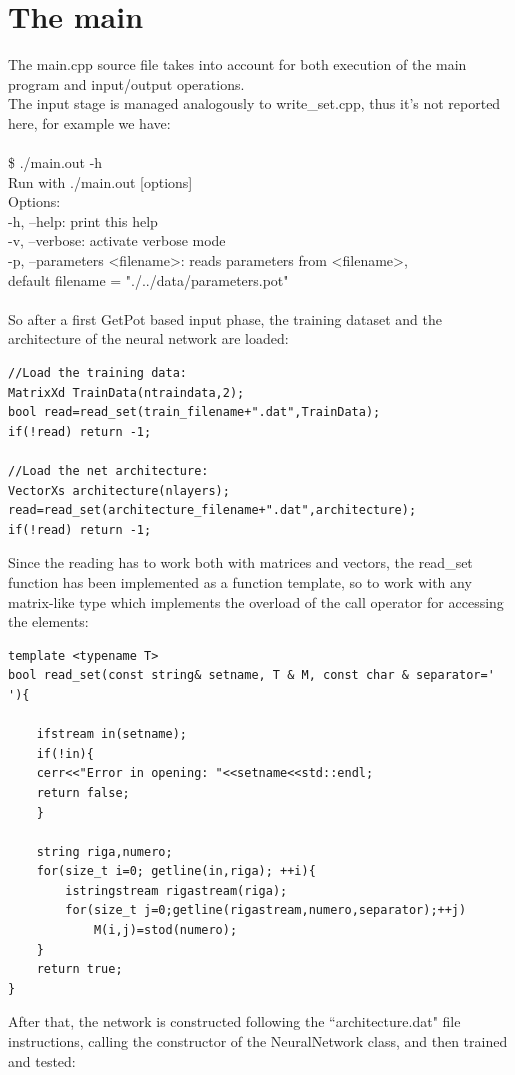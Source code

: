 \documentclass[12pt, a4paper]{report}
\theoremstyle{definition}
\begin{document}
\section{The main}
The {\ttfamily main.cpp} source file takes into account for both execution of the main program and input/output operations.\\
The input stage is managed analogously to {\ttfamily write\_set.cpp}, thus it's not reported here, for example we have:\\
{\\ \ttfamily 
	\$ ./main.out -h\\
	Run with ./main.out [options]\\
	Options:\\
	-h, --help: print this help\\
	-v, --verbose: activate verbose mode\\
	-p, --parameters <filename>: reads parameters from <filename>,\\
	default filename = "./../data/parameters.pot"\\
	 \\}
So after a first GetPot based input phase, the training dataset and the architecture of the neural network are loaded:
\begin{lstlisting}[frame=single]
//Load the training data:
MatrixXd TrainData(ntraindata,2);
bool read=read_set(train_filename+".dat",TrainData);
if(!read) return -1;

//Load the net architecture:
VectorXs architecture(nlayers);
read=read_set(architecture_filename+".dat",architecture);
if(!read) return -1;
\end{lstlisting}
Since the reading has to work both with matrices and vectors, the read\_set function has been implemented as a function template, so to work with any matrix-like type which implements the overload of the call operator for accessing the elements:
\begin{lstlisting}[frame=single, showstringspaces=false]
template <typename T> 
bool read_set(const string& setname, T & M, const char & separator=' '){

	ifstream in(setname);
	if(!in){
	cerr<<"Error in opening: "<<setname<<std::endl;
	return false;
	}

	string riga,numero;
	for(size_t i=0; getline(in,riga); ++i){
		istringstream rigastream(riga);
		for(size_t j=0;getline(rigastream,numero,separator);++j)
			M(i,j)=stod(numero);
	}
	return true;
}
\end{lstlisting}
After that, the network is constructed following the ``architecture.dat" file instructions, calling the constructor of the NeuralNetwork class, and then trained and tested:
\end{document}
